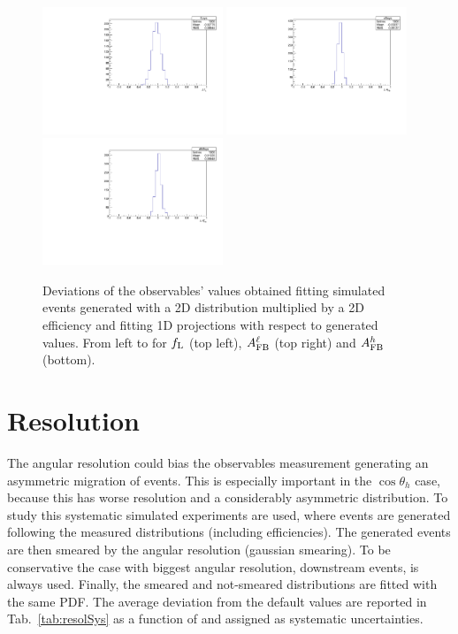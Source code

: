 \begin{figure}
\centering
\includegraphics[width=0.48\textwidth]{Lmumu/figs/fLsys_efficiency.pdf}
\includegraphics[width=0.48\textwidth]{Lmumu/figs/afbsys_efficiency.pdf}
\includegraphics[width=0.48\textwidth]{Lmumu/figs/afbBsys_efficiency.pdf}
\caption{Deviations of the observables' values obtained fitting simulated events
 generated with a 2D distribution multiplied by a 2D efficiency and fitting 1D projections
 with respect to generated values. From left to for $f_{\rm L}$ (top left), 
 $A_{\rm FB}^\ell$ (top right) and $A_{\rm FB}^h$ (bottom). }
\label{fig:effBias}
\end{figure}




\section{Resolution}

The angular resolution could bias the observables measurement 
generating an asymmetric migration of events.
This is especially important in the $\cos \theta_h$ case, because this has worse resolution
and a considerably asymmetric distribution. To study this systematic simulated experiments are used,
where events are generated following the measured distributions (including efficiencies).
The generated events are then smeared by the angular resolution (gaussian smearing).
To be conservative the case with biggest angular resolution, downstream events, is always used.
Finally, the smeared and not-smeared distributions are fitted with the same PDF.  
The average deviation from the default values are reported in Tab.~\ref{tab:resolSys}
as a function of \qsq and assigned as systematic uncertainties.

